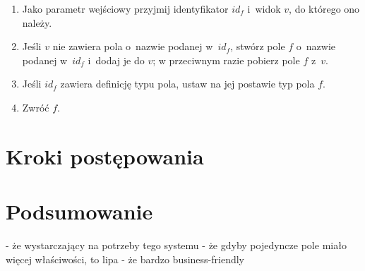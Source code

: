 \begin{enumerate}
 \item Jako parametr wejściowy przyjmij identyfikator $id_f$ i~widok $v$, do którego ono należy.
 \item Jeśli $v$ nie zawiera pola o~nazwie podanej w~$id_f$, stwórz pole $f$ o~nazwie podanej w~$id_f$ i~dodaj je do $v$; w przeciwnym razie pobierz pole $f$ z~$v$.
 \item Jeśli $id_f$ zawiera definicję typu pola, ustaw na jej postawie typ pola $f$.
 \item Zwróć $f$.
\end{enumerate}



\section{Kroki postępowania}



\section{Podsumowanie}

- że wystarczający na potrzeby tego systemu
- że gdyby pojedyncze pole miało więcej właściwości, to lipa
- że bardzo business-friendly

